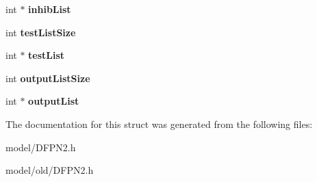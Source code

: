 \begin{DoxyCompactItemize}
\item 
\hypertarget{structPlace_aa4991c973bc6fe45745746d4bffe45c3}{int $\ast$ {\bfseries inhib\-List}}\label{structPlace_aa4991c973bc6fe45745746d4bffe45c3}

\item 
\hypertarget{structPlace_a091834a116f4fa02645808754e1f907f}{int {\bfseries test\-List\-Size}}\label{structPlace_a091834a116f4fa02645808754e1f907f}

\item 
\hypertarget{structPlace_af9ab6e3e4c3deec673c65ea8fce3eac3}{int $\ast$ {\bfseries test\-List}}\label{structPlace_af9ab6e3e4c3deec673c65ea8fce3eac3}

\item 
\hypertarget{structPlace_a8a3780c3114e34e469291383511b7cd1}{int {\bfseries output\-List\-Size}}\label{structPlace_a8a3780c3114e34e469291383511b7cd1}

\item 
\hypertarget{structPlace_a6b34af9235108d743f34034e5d4af49d}{int $\ast$ {\bfseries output\-List}}\label{structPlace_a6b34af9235108d743f34034e5d4af49d}

\end{DoxyCompactItemize}


The documentation for this struct was generated from the following files\-:\begin{DoxyCompactItemize}
\item 
model/D\-F\-P\-N2.\-h\item 
model/old/D\-F\-P\-N2.\-h\end{DoxyCompactItemize}
